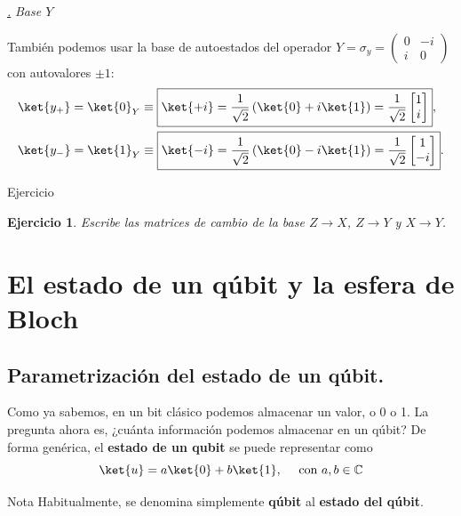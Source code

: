 \documentclass[a4paper,11pt]{book} %
\newtheorem{ejercicio_contador}{Ejercicio}
\newcommand{\Ejercicio}[1]{
		\begin{mybox_gray}{Ejercicio} 
			\begin{ejercicio_contador}
				 #1 
			\end{ejercicio_contador} 
		\end{mybox_gray}
	}
\numberwithin{equation}{chapter}
\def\lp{\left(}
\def\rp{\right)}
\def\subsubiContadorIt{\par\addtocounter{subsubsection}{1}\underline{\it\thesubsubsection.}\hskip0.5cm \setcounter{subsubsubsectionIt}{0}}
\newcommand{\SubsubiIt}[1]{
		\subsubiContadorIt \textit{#1}
	}
\newcounter{subsubsubsectionIt}[subsubsection]
\begin{document}
			\SubsubiIt{Base $Y$} 
			
También podemos usar la base de autoestados del operador $Y = \sigma_y = \lp \begin{matrix} 0 & -i \\ i & 0 \end{matrix} \rp $ con autovalores $\pm 1$:
	\begin{align}
	& \ket{y_+} = \ket{0}_Y \equiv \boxed{\ket{+i} = \frac{1}{\sqrt{2}} \lp \ket{0} + i \ket{1} \rp = \frac{1}{\sqrt{2}} \begin{bmatrix}  1 \\ i  \end{bmatrix}}, \label{ec_qubit_y-} \\
	& \ket{y_-} = \ket{1}_Y \equiv \boxed{\ket{-i} =  \frac{1}{\sqrt{2}} \lp \ket{0} - i \ket{1} \rp = \frac{1}{\sqrt{2}} \begin{bmatrix}  1 \\ -i  \end{bmatrix}}. \label{ec_qubit_y-}
	\end{align}
   	
	\Ejercicio{Escribe las matrices de cambio de la base $Z\to X$, $Z\to Y$ y $X\to Y$.}
	

    	
    \section{El estado de un qúbit y la esfera de Bloch}
    	\subsection{Parametrización del estado de un qúbit.}
    
Como ya sabemos, en un bit clásico podemos almacenar un valor, o 0 o 1. La pregunta ahora es, ¿cuánta información podemos almacenar en un qúbit? De forma genérica, el \textbf{estado de un qubit} se puede representar como
	\begin{equation}
	\ket{u} = a \ket{0} + b \ket{1}, ~~~~ \text{con } a,b \in \mathbb{C}
	\end{equation}
	
	\begin{mybox_blue}{Nota}
	Habitualmente, se denomina simplemente \textbf{qúbit} al \textbf{estado del qúbit}.
	\end{mybox_blue}	
	
\end{document}
